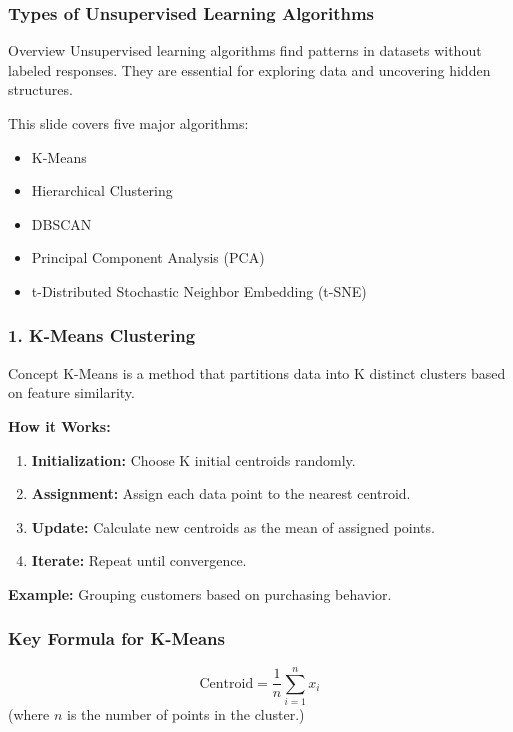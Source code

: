 \documentclass[aspectratio=169]{beamer}
\begin{document}
\begin{frame}[fragile]
    \frametitle{Types of Unsupervised Learning Algorithms}
    \begin{block}{Overview}
        Unsupervised learning algorithms find patterns in datasets without labeled responses. They are essential for exploring data and uncovering hidden structures. 
    \end{block}
    This slide covers five major algorithms:
    \begin{itemize}
        \item K-Means
        \item Hierarchical Clustering
        \item DBSCAN
        \item Principal Component Analysis (PCA)
        \item t-Distributed Stochastic Neighbor Embedding (t-SNE)
    \end{itemize}
\end{frame}

\begin{frame}[fragile]
    \frametitle{1. K-Means Clustering}
    \begin{block}{Concept}
        K-Means is a method that partitions data into K distinct clusters based on feature similarity.
    \end{block}
    \textbf{How it Works:}
    \begin{enumerate}
        \item \textbf{Initialization:} Choose K initial centroids randomly.
        \item \textbf{Assignment:} Assign each data point to the nearest centroid.
        \item \textbf{Update:} Calculate new centroids as the mean of assigned points.
        \item \textbf{Iterate:} Repeat until convergence.
    \end{enumerate}
    \textbf{Example:} Grouping customers based on purchasing behavior.
\end{frame}

\begin{frame}[fragile]
    \frametitle{Key Formula for K-Means}
    \begin{equation}
        \text{Centroid} = \frac{1}{n} \sum_{i=1}^{n} x_i
    \end{equation}
    (where \(n\) is the number of points in the cluster.)
\end{frame}
\end{document}

